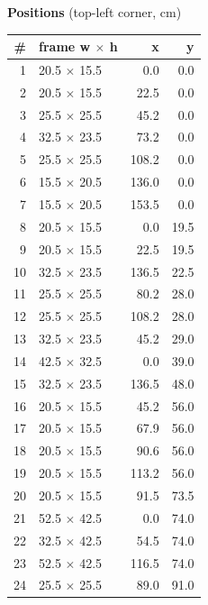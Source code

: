 \documentclass[a4paper,landscape,10pt]{article}
\begin{document}
\begin{minipage}[t]{0.25\textwidth}
\vspace{8pt}
{\bfseries Positions} (top-left corner, cm)\\[2pt]
\tiny
\begin{tabular}{@{}r l r r@{}}
\toprule
\# & frame w $\times$ h & x & y \\
\midrule
1 & 20.5 $\times$ 15.5 & 0.0 & 0.0 \\
2 & 20.5 $\times$ 15.5 & 22.5 & 0.0 \\
3 & 25.5 $\times$ 25.5 & 45.2 & 0.0 \\
4 & 32.5 $\times$ 23.5 & 73.2 & 0.0 \\
5 & 25.5 $\times$ 25.5 & 108.2 & 0.0 \\
6 & 15.5 $\times$ 20.5 & 136.0 & 0.0 \\
7 & 15.5 $\times$ 20.5 & 153.5 & 0.0 \\
8 & 20.5 $\times$ 15.5 & 0.0 & 19.5 \\
9 & 20.5 $\times$ 15.5 & 22.5 & 19.5 \\
10 & 32.5 $\times$ 23.5 & 136.5 & 22.5 \\
11 & 25.5 $\times$ 25.5 & 80.2 & 28.0 \\
12 & 25.5 $\times$ 25.5 & 108.2 & 28.0 \\
13 & 32.5 $\times$ 23.5 & 45.2 & 29.0 \\
14 & 42.5 $\times$ 32.5 & 0.0 & 39.0 \\
15 & 32.5 $\times$ 23.5 & 136.5 & 48.0 \\
16 & 20.5 $\times$ 15.5 & 45.2 & 56.0 \\
17 & 20.5 $\times$ 15.5 & 67.9 & 56.0 \\
18 & 20.5 $\times$ 15.5 & 90.6 & 56.0 \\
19 & 20.5 $\times$ 15.5 & 113.2 & 56.0 \\
20 & 20.5 $\times$ 15.5 & 91.5 & 73.5 \\
21 & 52.5 $\times$ 42.5 & 0.0 & 74.0 \\
22 & 32.5 $\times$ 42.5 & 54.5 & 74.0 \\
23 & 52.5 $\times$ 42.5 & 116.5 & 74.0 \\
24 & 25.5 $\times$ 25.5 & 89.0 & 91.0 \\
\bottomrule
\end{tabular}
\end{minipage}
\clearpage
\end{document}
